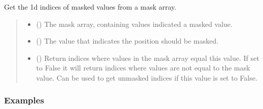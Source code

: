 \documentclass[letterpaper,10pt,english]{sphinxmanual}
\begin{document}
\begin{fulllineitems}
\label{\detokenize{misc:glomar_gridding.mask.get_mask_idx}}
\pysigstartsignatures
\pysiglinewithargsret
{}
{\sphinxparamcomma {}\sphinxparamcomma {}}
{}
\pysigstopsignatures
\sphinxAtStartPar
Get the 1d indices of masked values from a mask array.
\begin{quote}\begin{description}
\begin{itemize}
\item {}
\sphinxAtStartPar
{} () \textendash{} The mask array, containing values indicated a masked value.

\item {}
\sphinxAtStartPar
{} () \textendash{} The value that indicates the position should be masked.

\item {}
\sphinxAtStartPar
{} () \textendash{} Return indices where values in the mask array equal this value. If set
to False it will return indices where values are not equal to the mask
value. Can be used to get unmasked indices if this value is set to
False.

\end{itemize}

\sphinxAtStartPar
{}

\end{description}\end{quote}
\subsubsection*{Examples}


\end{fulllineitems}
\end{document}
